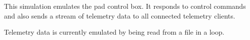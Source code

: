 This simulation emulates the pad control box. It responds to control commands and also sends a stream of telemetry data to all connected telemetry clients.

Telemetry data is currently emulated by being read from a file in a loop. 